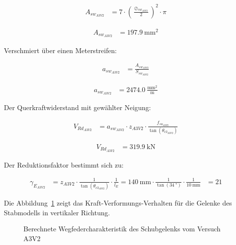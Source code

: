 \documentclass[
  11pt,
  letterpaper,
]{scrreprt}
\begin{document}
$$
\begin{aligned}
A_{sw_{A3V2}} &= 7 \cdot \left( \frac{ \oslash_{sw_{A3V2}} }{ 2 } \right) ^{ 2 } \cdot \pi \; 
\end{aligned}
$$

$$
\begin{aligned}
A_{sw_{A3V2}} &= 197.9\ \mathrm{mm}^{2} \;
\end{aligned}
$$

Verschmiert über einen Meterstreifen:

$$
\begin{aligned}
a_{sw_{A3V2}} &= \frac{ A_{sw_{A3V2}} }{ S_{sw_{A3V2}} } \; 
\end{aligned}
$$

$$
\begin{aligned}
a_{sw_{A3V2}} &= 2474.0\ \frac{\mathrm{mm}^{2}}{\mathrm{m}} \;
\end{aligned}
$$

Der Querkraftwiderstand mit gewählter Neigung:

$$
\begin{aligned}
V_{Rd_{A3V2}} &= a_{sw_{A3V2}} \cdot z_{A3V2} \cdot \frac{ f_{su_{A3V2}} }{ \tan \left( \theta_{c3_{A3V2}} \right) } \; 
\end{aligned}
$$

$$
\begin{aligned}
V_{Rd_{A3V2}} &= 319.9\ \mathrm{kN} \;
\end{aligned}
$$

Der Reduktionsfaktor bestimmt sich zu:

$$
\begin{aligned}
\gamma_{E_{A3V2}} &= z_{A3V2} \cdot \frac{ 1 }{ \tan \left( \theta_{c3_{A3V2}} \right) } \cdot \frac{1} { l_{E} }  = 140\ \mathrm{mm} \cdot \frac{ 1 }{ \tan \left( 34\ \mathrm{°} \right) } \cdot \frac{1} { 10\ \mathrm{mm} } &= 21\  
\end{aligned}
$$

Die Abbildung~\ref{fig-wegfeder-schub-a3v2} zeigt das
Kraft-Verformungs-Verhalten für die Gelenke des Stabmodells in
vertikaler Richtung.

\begin{figure}[H]


\caption{\label{fig-wegfeder-schub-a3v2}Berechnete
Wegfedercharakteristik des Schubgelenks vom Versuch A3V2}

\end{figure}%
\end{document}
